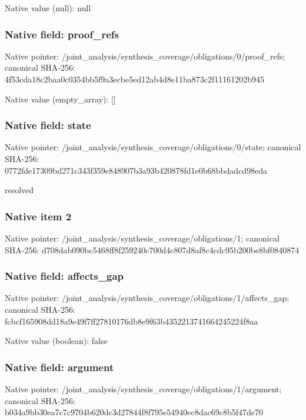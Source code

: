 \documentclass[10pt,a4paper]{article}
\begin{document}
Native value (null): null

\subsubsection{Native field: proof\_\allowbreak{}refs}
Native pointer: /joint\_\allowbreak{}analysis/synthesis\_\allowbreak{}coverage/obligations/0/proof\_\allowbreak{}refs; canonical SHA-256: 4f53cda18c2baa0c0354bb5f9a3ecbe5ed12ab4d8e11ba873c2f11161202b945

Native value (empty\_\allowbreak{}array): []

\subsubsection{Native field: state}
Native pointer: /joint\_\allowbreak{}analysis/synthesis\_\allowbreak{}coverage/obligations/0/state; canonical SHA-256: 0772fde17309bd271c343f359e848907b3a93b420878fd1e0b68bbdadcd98eda

\begingroup\raggedright\sloppy resolved\par\endgroup

\subsubsection{Native item 2}
Native pointer: /joint\_\allowbreak{}analysis/synthesis\_\allowbreak{}coverage/obligations/1; canonical SHA-256: d708dab090bc5468ff8f259240c700d4c807d8af8c4cdc95b200be8bf0840874

\subsubsection{Native field: affects\_\allowbreak{}gap}
Native pointer: /joint\_\allowbreak{}analysis/synthesis\_\allowbreak{}coverage/obligations/1/affects\_\allowbreak{}gap; canonical SHA-256: fcbcf165908dd18a9e49f7ff27810176db8e9f63b4352213741664245224f8aa

Native value (boolean): false

\subsubsection{Native field: argument}
Native pointer: /joint\_\allowbreak{}analysis/synthesis\_\allowbreak{}coverage/obligations/1/argument; canonical SHA-256: b034a9bb30ea7c7c9704b620dc3d27844f8f795e54940ec8dac69c8b5f47de70
\end{document}
